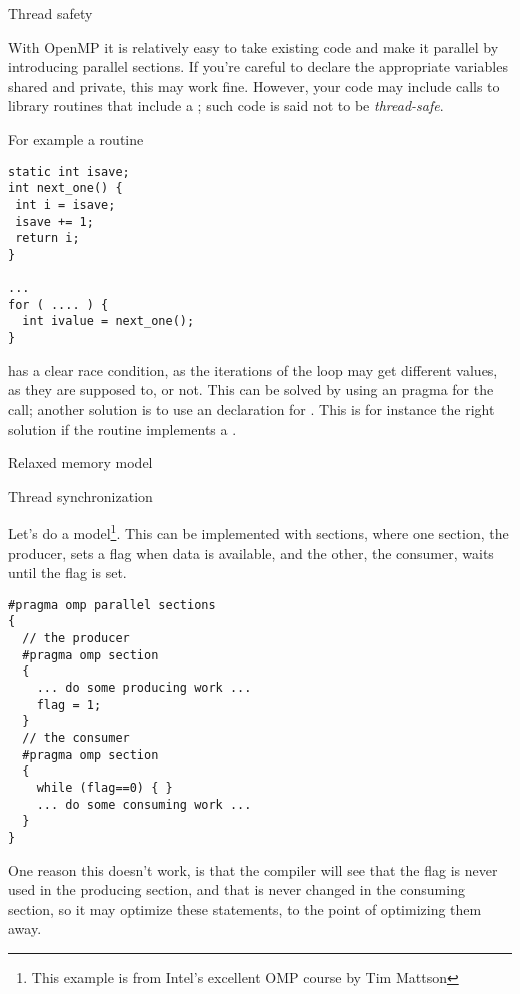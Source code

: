 
 {Thread safety}

With OpenMP it is relatively easy to take existing code and make
it parallel by introducing parallel sections. If you're careful
to declare the appropriate variables shared and private,
this may work fine. However, your code may include
calls to library routines that include a ;
such code is said not to be \emph{thread-safe}.

For example a routine
\begin{verbatim}
static int isave;
int next_one() {
 int i = isave;
 isave += 1;
 return i;
}

...
for ( .... ) {
  int ivalue = next_one();
}
\end{verbatim}
has a clear race condition, as the iterations of the loop
may get different  values, as they are supposed to,
or not. This can be solved by using an 
pragma for the  call; another solution 
is to use an  declaration for .
This is for instance the right solution if  the 
routine implements a .


 {Relaxed memory model}

 {Thread synchronization}

Let's do a  model\footnote{This example
  is from Intel's excellent OMP course by Tim Mattson}.  This can be
implemented with sections, where one section, the producer, sets a
flag when data is available, and the other, the consumer, waits until
the flag is set.
\begin{verbatim}
#pragma omp parallel sections
{
  // the producer
  #pragma omp section
  {
    ... do some producing work ...
    flag = 1;
  }
  // the consumer
  #pragma omp section
  {
    while (flag==0) { }
    ... do some consuming work ...
  }
}
\end{verbatim}
One reason this doesn't work, is that the compiler will see that the flag is never used
in the producing section, and that is never changed in the consuming section, so
it may optimize these statements, to the point of optimizing them away.

